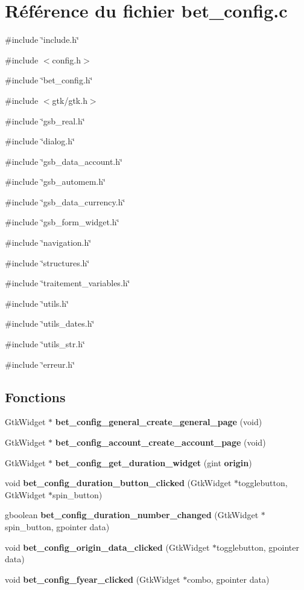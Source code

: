 \section{Référence du fichier bet\_\-config.c}
\label{bet__config_8c}
{\ttfamily \#include \char`\"{}include.h\char`\"{}}\par
{\ttfamily \#include $<$config.h$>$}\par
{\ttfamily \#include \char`\"{}bet\_\-config.h\char`\"{}}\par
{\ttfamily \#include $<$gtk/gtk.h$>$}\par
{\ttfamily \#include \char`\"{}gsb\_\-real.h\char`\"{}}\par
{\ttfamily \#include \char`\"{}dialog.h\char`\"{}}\par
{\ttfamily \#include \char`\"{}gsb\_\-data\_\-account.h\char`\"{}}\par
{\ttfamily \#include \char`\"{}gsb\_\-automem.h\char`\"{}}\par
{\ttfamily \#include \char`\"{}gsb\_\-data\_\-currency.h\char`\"{}}\par
{\ttfamily \#include \char`\"{}gsb\_\-form\_\-widget.h\char`\"{}}\par
{\ttfamily \#include \char`\"{}navigation.h\char`\"{}}\par
{\ttfamily \#include \char`\"{}structures.h\char`\"{}}\par
{\ttfamily \#include \char`\"{}traitement\_\-variables.h\char`\"{}}\par
{\ttfamily \#include \char`\"{}utils.h\char`\"{}}\par
{\ttfamily \#include \char`\"{}utils\_\-dates.h\char`\"{}}\par
{\ttfamily \#include \char`\"{}utils\_\-str.h\char`\"{}}\par
{\ttfamily \#include \char`\"{}erreur.h\char`\"{}}\par
\subsection*{Fonctions}
\begin{DoxyCompactItemize}
\item 
GtkWidget $\ast$ {\bf bet\_\-config\_\-general\_\-create\_\-general\_\-page} (void)
\item 
GtkWidget $\ast$ {\bf bet\_\-config\_\-account\_\-create\_\-account\_\-page} (void)
\item 
GtkWidget $\ast$ {\bf bet\_\-config\_\-get\_\-duration\_\-widget} (gint {\bf origin})
\item 
void {\bf bet\_\-config\_\-duration\_\-button\_\-clicked} (GtkWidget $\ast$togglebutton, GtkWidget $\ast$spin\_\-button)
\item 
gboolean {\bf bet\_\-config\_\-duration\_\-number\_\-changed} (GtkWidget $\ast$spin\_\-button, gpointer data)
\item 
void {\bf bet\_\-config\_\-origin\_\-data\_\-clicked} (GtkWidget $\ast$togglebutton, gpointer data)
\item 
void {\bf bet\_\-config\_\-fyear\_\-clicked} (GtkWidget $\ast$combo, gpointer data)
\end{DoxyCompactItemize}
